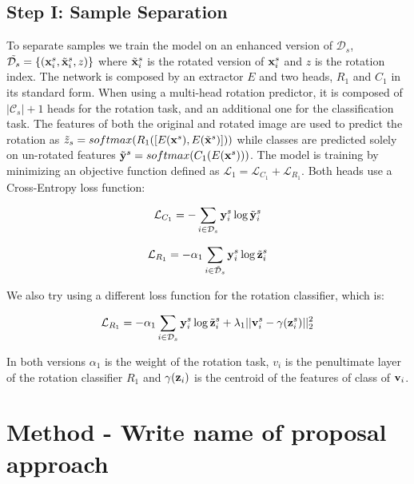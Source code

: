 \documentclass[10pt,twocolumn,letterpaper]{article}
\begin{document}
\subsection{Step I: Sample Separation}

To separate samples we train the model on an enhanced version of $\mathcal{D}_s$, $\tilde{\mathcal{D}_s} = \{({\bf x}_i^s, \tilde{\bf x}_i^s, z)\}$ where $\tilde{\bf x}_i^s$ is the rotated version of ${\bf x}_i^s$ and $z$ is the rotation index.
The network is composed by an extractor $E$ and two heads, $R_1$ and $C_1$ in its standard form.
When using a multi-head rotation predictor, it is composed of $|\mathcal{C}_s|+1$ heads for the rotation task, and an additional one for the classification task.
The features of both the original and rotated image are used to predict the rotation as $\tilde{z}_s = softmax(R_1([E({\bf x}^s), E(\tilde{\bf x}^s)]))$ while classes are predicted solely on un-rotated features $\tilde{\bf y}^s = softmax(C_1(E({\bf x}^s)))$.
The model is training by minimizing an objective function defined as $\mathcal{L}_1 = \mathcal{L}_{C_1} + \mathcal{L}_{R_1}$.
Both heads use a Cross-Entropy loss function:

\begin{equation}
  \mathcal{L}_{C_1} = -\sum_{i\in\mathcal{D}_s} {\bf y}_i^s \log \tilde{\bf y}_i^s
\end{equation}
\label{eq:baseloss_class}

\begin{equation}
  \mathcal{L}_{R_1} = -\alpha_1\sum_{i\in\mathcal{\tilde{D}}_s} {\bf y}_i^s \log \tilde{{\bf z}}_i^s
\end{equation}
\label{eq:baseloss_rot}

We also try using a different loss function for the rotation classifier, which is:

\begin{equation}
  \mathcal{L}_{R_1} = -\alpha_1\sum_{i\in\mathcal{D}_s} {\bf y}_i^s \log \tilde{{\bf z}}_i^s+\lambda_1||{\bf v}_i^s-\gamma({\bf z}_i^s)||_2^2
\end{equation}
\label{eq:center_loss}

In both versions $\alpha_1$ is the weight of the rotation task, $v_i$ is the penultimate layer of the rotation classifier $R_1$ and $\gamma({\bf z}_i)$ is the centroid of the features of class of ${\bf v}_i$.

\section{Method - Write name of proposal approach}
\label{sec:method}
\end{document}
